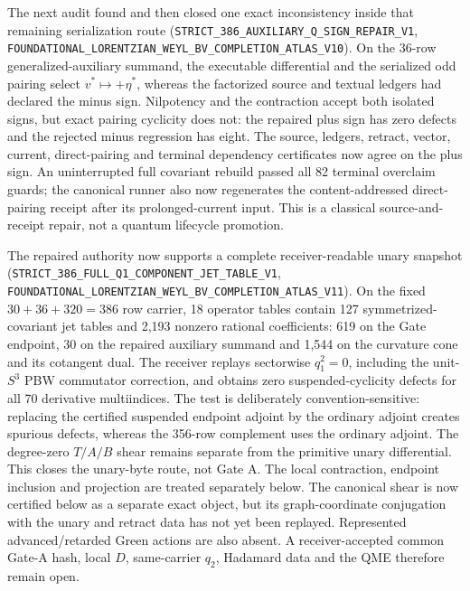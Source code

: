 \documentclass[11pt]{article}
\theoremstyle{definition}
\theoremstyle{remark}
\newcommand{\cert}[1]{\nolinkurl{#1}}
\begin{document}
The next audit found and then closed one exact inconsistency inside that
remaining serialization route
(\cert{STRICT_386_AUXILIARY_Q_SIGN_REPAIR_V1},
\cert{FOUNDATIONAL_LORENTZIAN_WEYL_BV_COMPLETION_ATLAS_V10}).  On the
36-row generalized-auxiliary summand, the executable differential and the
serialized odd pairing select $v^*\mapsto+\eta^*$, whereas the factorized
source and textual ledgers had declared the minus sign.  Nilpotency and the
contraction accept both isolated signs, but exact pairing cyclicity does not:
the repaired plus sign has zero defects and the rejected minus regression has
eight.  The source, ledgers, retract, vector, current, direct-pairing and
terminal dependency certificates now agree on the plus sign.  An uninterrupted
full covariant rebuild passed all 82 terminal overclaim guards; the canonical
runner also now regenerates the content-addressed direct-pairing receipt after
its prolonged-current input.  This is a classical source-and-receipt repair,
not a quantum lifecycle promotion.

The repaired authority now supports a complete receiver-readable unary
snapshot
(\cert{STRICT_386_FULL_Q1_COMPONENT_JET_TABLE_V1},
\cert{FOUNDATIONAL_LORENTZIAN_WEYL_BV_COMPLETION_ATLAS_V11}).  On the fixed
$30+36+320=386$ row carrier, 18 operator tables contain 127
symmetrized-covariant jet tables and 2,193 nonzero rational coefficients:
619 on the Gate endpoint, 30 on the repaired auxiliary summand and 1,544 on
the curvature cone and its cotangent dual.  The receiver replays sectorwise
$q_1^2=0$, including the unit-$S^3$ PBW commutator correction, and obtains
zero suspended-cyclicity defects for all 70 derivative multiindices.  The
test is deliberately convention-sensitive: replacing the certified
suspended endpoint adjoint by the ordinary adjoint creates spurious defects,
whereas the 356-row complement uses the ordinary adjoint.  The degree-zero
$T/A/B$ shear remains separate from the primitive unary differential.
This closes the unary-byte route, not Gate A.  The local contraction,
endpoint inclusion and projection are treated separately below.  The canonical
shear is now certified below as a separate exact object, but its graph-coordinate
conjugation with the unary and retract data has not yet been replayed.
Represented advanced/retarded Green actions are also absent.  A receiver-accepted common
Gate-A hash, local $D$, same-carrier $q_2$, Hadamard data and the QME therefore
remain open.
\end{document}
